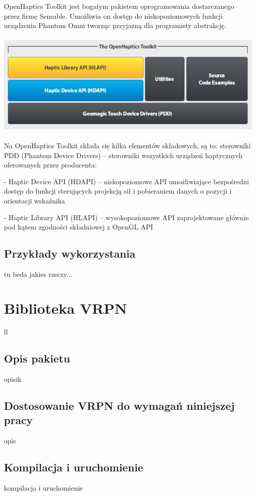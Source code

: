 \documentclass[licencjacka]{pracamgr}
\begin{document}
OpenHaptics Toolkit jest bogatym pakietem oprogramowania dostarczanego przez firmę Sensable. Umożliwia on dostęp do niskopoziomowych funkcji urządzenia Phantom Omni tworząc przyjazną dla programisty abstrakcję. 
\\
\\
\includegraphics[scale=0.5,center]{openhaptics}
\\
\\
Na OpenHaptics Toolkit składa się kilka elementów składowych, są to:
sterowniki PDD (Phantom Device Drivers) – sterowniki wszystkich urządzeń haptycznych oferowanych przez producenta:

- Haptic Device API (HDAPI) – niskopoziomowe API umożliwiające bezpośredni dostęp do funkcji sterujących projekcją sił i pobieraniem danych o pozycji i orientacji wskaźnika

- Haptic Library API (HLAPI) – wysokopoziomowe API zaprojektowane głównie pod kątem zgodności składniowej z OpenGL API

\section{Przykłady wykorzystania}
tu beda jakies rzeczy...


\chapter{Biblioteka VRPN}
ll

\section{Opis pakietu}
opisik

\section{Dostosowanie VRPN do wymagań niniejszej pracy}
opis

\section{Kompilacja i uruchomienie}
kompilacja i uruchomienie
\end{document}
